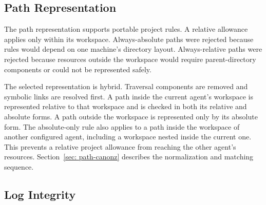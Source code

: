 \subsection{Path Representation}
\label{sec:gov-path-representation}

{\color{red}The path representation supports portable project rules. A relative
allowance applies only within its workspace. Always-absolute paths were rejected
because rules would depend on one machine's directory layout. Always-relative
paths were rejected because resources outside the workspace would require
parent-directory components or could not be represented safely.

The selected representation is hybrid. Traversal components are removed and
symbolic links are resolved first. A path inside the current agent's workspace
is represented relative to that workspace and is checked in both its relative
and absolute forms. A path outside the workspace is represented only by its
absolute form. The absolute-only rule also applies to a path inside the
workspace of another configured agent, including a workspace nested inside the
current one. This prevents a relative project allowance from reaching the other
agent's resources. Section~\ref{sec: path-canonz} describes the normalization
and matching sequence.}



\subsection{Log Integrity}
\label{sec:gov-log-integrity}

